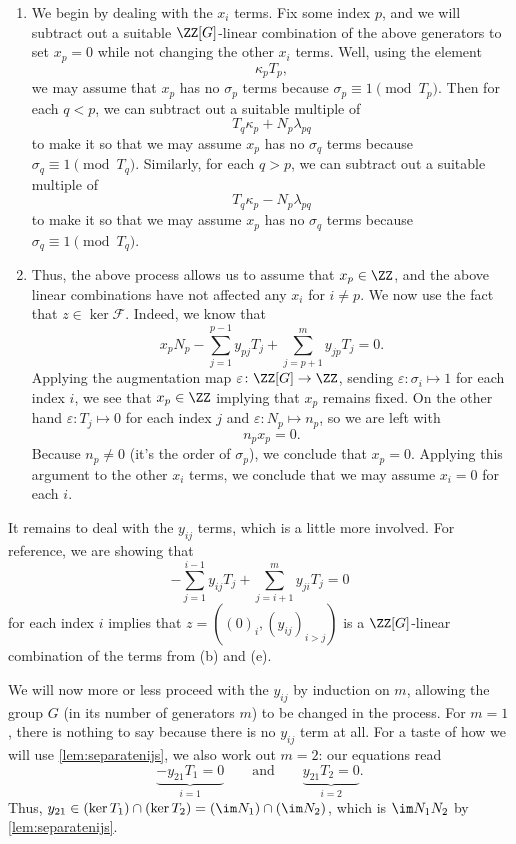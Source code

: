\documentclass{article}
\numberwithin{equation}{section}
\begin{document}
\begin{enumerate}
	\item We begin by dealing with the $x_i$ terms. Fix some index $p$, and we will subtract out a suitable $\ZZ[G]$-linear combination of the above generators to set $x_p=0$ while not changing the other $x_i$ terms. Well, using the element
	\[\kappa_pT_p,\tag{a}\]
	we may assume that $x_p$ has no $\sigma_p$ terms because $\sigma_p\equiv1\pmod{T_p}$. Then for each $q<p$, we can subtract out a suitable multiple of
	\[T_q\kappa_p+N_p\lambda_{pq}\tag{c}\]
	to make it so that we may assume $x_p$ has no $\sigma_q$ terms because $\sigma_q\equiv1\pmod{T_q}$. Similarly, for each $q>p$, we can subtract out a suitable multiple of
	\[T_q\kappa_p-N_p\lambda_{pq}\tag{d}\]
	to make it so that we may assume $x_p$ has no $\sigma_q$ terms because $\sigma_q\equiv1\pmod{T_q}$.

	\item Thus, the above process allows us to assume that $x_p\in\ZZ$, and the above linear combinations have not affected any $x_i$ for $i\ne p$. We now use the fact that $z\in\ker\mathcal F$. Indeed, we know that
	\[x_pN_p-\sum_{j=1}^{p-1}y_{pj}T_j+\sum_{j=p+1}^my_{jp}T_j=0.\]
	Applying the augmentation map $\varepsilon\colon\ZZ[G]\to\ZZ$, sending $\varepsilon\colon\sigma_i\mapsto1$ for each index $i$, we see that $x_p\in\ZZ$ implying that $x_p$ remains fixed. On the other hand $\varepsilon\colon T_j\mapsto0$ for each index $j$ and $\varepsilon\colon N_p\mapsto n_p$, so we are left with
	\[n_px_p=0.\]
	Because $n_p\ne0$ (it's the order of $\sigma_p$), we conclude that $x_p=0$. Applying this argument to the other $x_i$ terms, we conclude that we may assume $x_i=0$ for each $i$.
\end{enumerate}
It remains to deal with the $y_{ij}$ terms, which is a little more involved. For reference, we are showing that
\[-\sum_{j=1}^{i-1}y_{ij}T_j+\sum_{j=i+1}^my_{ji}T_j=0\]
for each index $i$ implies that $z=((0)_i,(y_{ij})_{i>j})$ is a $\ZZ[G]$-linear combination of the terms from (b) and (e).

We will now more or less proceed with the $y_{ij}$ by induction on $m$, allowing the group $G$ (in its number of generators $m$) to be changed in the process. For $m=1$, there is nothing to say because there is no $y_{ij}$ term at all. For a taste of how we will use \autoref{lem:separatenijs}, we also work out $m=2$: our equations read
\[\underbrace{-y_{21}T_1=0}_{i=1}\qquad\text{and}\qquad\underbrace{y_{21}T_2=0}_{i=2}.\]
Thus, $y_{21}\in(\ker T_1)\cap(\ker T_2)=(\im N_1)\cap(\im N_2)$, which is $\im N_1N_2$ by \autoref{lem:separatenijs}.
\end{document}
